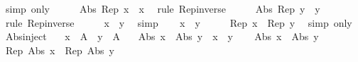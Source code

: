 \begin{isabellebody}
\ {\isacharparenleft}{\kern0pt}simp\ only{\isacharcolon}{\kern0pt}{\isacharparenright}{\kern0pt}\isanewline
\ \ \isamarkupfalse%
\ \isamarkupfalse%
\ {\isachardoublequoteopen}Abs\ {\isacharparenleft}{\kern0pt}Rep\ x{\isacharparenright}{\kern0pt}\ {\isacharequal}{\kern0pt}\ x{\isachardoublequoteclose}\ \isamarkupfalse%
\ {\isacharparenleft}{\kern0pt}rule\ Rep{\isacharunderscore}{\kern0pt}inverse{\isacharparenright}{\kern0pt}\isanewline
\ \ \isamarkupfalse%
\ \isamarkupfalse%
\ {\isachardoublequoteopen}Abs\ {\isacharparenleft}{\kern0pt}Rep\ y{\isacharparenright}{\kern0pt}\ {\isacharequal}{\kern0pt}\ y{\isachardoublequoteclose}\ \isamarkupfalse%
\ {\isacharparenleft}{\kern0pt}rule\ Rep{\isacharunderscore}{\kern0pt}inverse{\isacharparenright}{\kern0pt}\isanewline
\ \ \isamarkupfalse%
\ \isamarkupfalse%
\ {\isachardoublequoteopen}x\ {\isacharequal}{\kern0pt}\ y{\isachardoublequoteclose}\ \isamarkupfalse%
\ simp\isanewline
{}\isamarkupfalse%
\isanewline
\ \ \isamarkupfalse%
\ {\isachardoublequoteopen}x\ {\isacharequal}{\kern0pt}\ y{\isachardoublequoteclose}\isanewline
\ \ \isamarkupfalse%
\ \isamarkupfalse%
\ {\isachardoublequoteopen}Rep\ x\ {\isacharequal}{\kern0pt}\ Rep\ y{\isachardoublequoteclose}\ \isamarkupfalse%
\ {\isacharparenleft}{\kern0pt}simp\ only{\isacharcolon}{\kern0pt}{\isacharparenright}{\kern0pt}\isanewline
{}\isamarkupfalse%
%
\endisatagproof
{\isafoldproof}%
%
\isadelimproof
\isanewline
%
\endisadelimproof
\isanewline
{}\isamarkupfalse%
\ Abs{\isacharunderscore}{\kern0pt}inject{\isacharcolon}{\kern0pt}\isanewline
\ \ \ {\isachardoublequoteopen}x\ {\isasymin}\ A{\isachardoublequoteclose}\ \ {\isachardoublequoteopen}y\ {\isasymin}\ A{\isachardoublequoteclose}\isanewline
\ \ \ {\isachardoublequoteopen}Abs\ x\ {\isacharequal}{\kern0pt}\ Abs\ y\ {\isasymlongleftrightarrow}\ x\ {\isacharequal}{\kern0pt}\ y{\isachardoublequoteclose}\isanewline
%
\isadelimproof
%
\endisadelimproof
%
\isatagproof
{}\isamarkupfalse%
\isanewline
\ \ \isamarkupfalse%
\ {\isachardoublequoteopen}Abs\ x\ {\isacharequal}{\kern0pt}\ Abs\ y{\isachardoublequoteclose}\isanewline
\ \ \isamarkupfalse%
\ \isamarkupfalse%
\ {\isachardoublequoteopen}Rep\ {\isacharparenleft}{\kern0pt}Abs\ x{\isacharparenright}{\kern0pt}\ {\isacharequal}{\kern0pt}\ Rep\ {\isacharparenleft}{\kern0pt}Abs\ y{\isacharparenright}{\kern0pt}{\isachardoublequoteclose}\ \isamarkupfalse%

\end{isabellebody}
